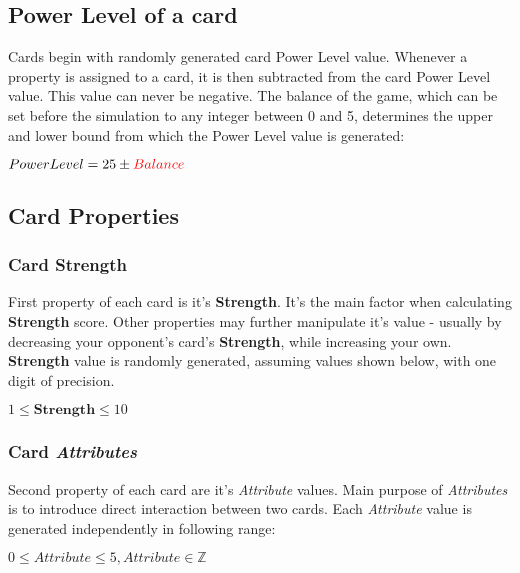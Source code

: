 \documentclass{article}
\begin{document}
\subsection{Power Level of a card}
    
    Cards begin with randomly generated card Power Level value.  Whenever a property 
    is assigned to a card, it is then subtracted from the card Power Level value. 
    This value can never be negative. The balance of the game, which can be set before the simulation to any integer between 0 and 5, determines the upper and lower bound from which the Power Level value is generated:
    
    \begin{center}
        $Power Level = 25\pm \textcolor{red}{Balance}$ \\
    \end{center}

\clearpage

\subsection{Card Properties}

\subsubsection{Card \textbf{Strength}}

    First property of each card is it's \textbf{Strength}. It's the main factor when calculating \textbf{Strength} score. Other properties may further manipulate it's value - usually by decreasing your opponent's card's \textbf{Strength}, while increasing your own. \textbf{Strength} value is randomly generated, assuming values shown below, with one digit of precision.

\begin{center}
   $1 \leq \textbf{Strength} \leq 10$   
\end{center}
  
\subsubsection{Card \textit{Attributes}}

    Second property of each card are it's \textit{Attribute} values. Main purpose of \textit{Attributes} is to introduce direct interaction between two cards. Each \textit{Attribute} value is generated independently in following range: 
    
    \begin{center}
    $0 \leq \textit{Attribute} \leq 5, \textit{Attribute} \in \mathbb{Z}$
    \end{center}
    
\end{document}
